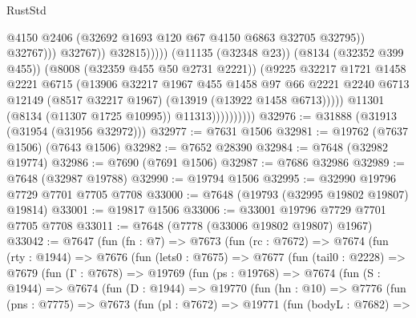 \begin{lexlean}{RustStd}
\begin{coremodule}
                                                @4150
                                                @2406
                                                (@32692 @1693 @120 @67 @4150 @6863 @32705 @32795))
                                              @32767)))
                                        @32767))
                                    @32815)))))
                          (@11135 (@32348 @23))
                          (@8134 (@32352 @399 @455))
                          (@8008 (@32359 @455 @50 @2731 @2221))
                          (@9225
                            @32217
                            @1721
                            @1458
                            @2221
                            @6715
                            (@13906
                              @32217
                              @1967
                              @455
                              @1458
                              @97
                              @66
                              @2221
                              @2240
                              @6713
                              @12149
                              (@8517 @32217 @1967)
                              (@13919 (@13922 @1458 @6713)))))
                        @11301
                        (@8134 (@11307 @1725 @10995))
                        @11313))))))))))
@32976 := @31888 (@31913 (@31954 (@31956 @32972)))
@32977 := @7631 @1506
@32981 := @19762 (@7637 @1506) (@7643 @1506)
@32982 := @7652 @28390
@32984 := @7648 (@32982 @19774)
@32986 := @7690 (@7691 @1506)
@32987 := @7686 @32986
@32989 := @7648 (@32987 @19788)
@32990 := @19794 @1506
@32995 := @32990 @19796 @7729 @7701 @7705 @7708
@33000 := @7648 (@19793 (@32995 @19802 @19807) @19814)
@33001 := @19817 @1506
@33006 := @33001 @19796 @7729 @7701 @7705 @7708
@33011 := @7648 (@7778 (@33006 @19802 @19807) @1967)
@33042 := @7647
    (fun (fn : @7) =>
    @7673
      (fun (rc : @7672) =>
      @7674
        (fun (rty : @1944) =>
        @7676
          (fun (lets0 : @7675) =>
          @7677
            (fun (tail0 : @2228) =>
            @7679
              (fun (Γ : @7678) =>
              @19769
                (fun (ps : @19768) =>
                @7674
                  (fun (S : @1944) =>
                  @7674
                    (fun (D : @1944) =>
                    @19770
                      (fun (hn : @10) =>
                      @7776
                        (fun (pns : @7775) =>
                        @7673
                          (fun (pl : @7672) =>
                          @19771
                            (fun (bodyL : @7682) =>

\end{coremodule}
\end{lexlean}
